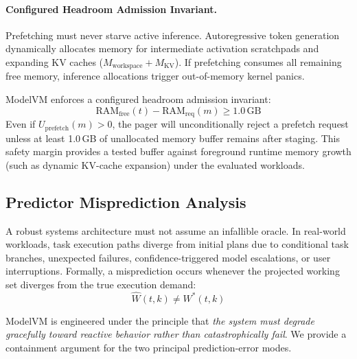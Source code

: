 \paragraph{Configured Headroom Admission Invariant.}
Prefetching must never starve active inference. Autoregressive token generation dynamically allocates memory for intermediate activation scratchpads and expanding KV caches ($M_{\text{workspace}} + M_{\text{KV}}$). If prefetching consumes all remaining free memory, inference allocations trigger out-of-memory kernel panics.

ModelVM enforces a configured headroom admission invariant:
\begin{equation}
\text{RAM}_{\text{free}}(t) - \text{RAM}_{\text{req}}(m) \ge 1.0\,\text{GB}
\label{eq:headroom_invariant}
\end{equation}
Even if $U_{\text{prefetch}}(m) > 0$, the pager will unconditionally reject a prefetch request unless at least 1.0\,GB of unallocated memory buffer remains after staging. This safety margin provides a tested buffer against foreground runtime memory growth (such as dynamic KV-cache expansion) under the evaluated workloads.

\subsection{Predictor Misprediction Analysis}
\label{sec:misprediction_analysis}

A robust systems architecture must not assume an infallible oracle. In real-world workloads, task execution paths diverge from initial plans due to conditional task branches, unexpected failures, confidence-triggered model escalations, or user interruptions. Formally, a misprediction occurs whenever the projected working set diverges from the true execution demand:
\begin{equation}
\widehat{W}(t, k) \neq W^*(t, k)
\end{equation}

ModelVM is engineered under the principle that \textit{the system must degrade gracefully toward reactive behavior rather than catastrophically fail}. We provide a containment argument for the two principal prediction-error modes.

